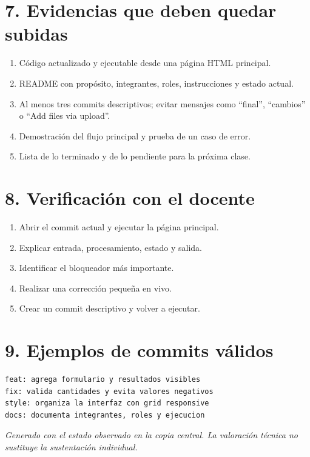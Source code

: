 \documentclass[10pt,a4paper]{article}
\begin{document}
\newpage
\section*{7. Evidencias que deben quedar subidas}
\begin{enumerate}
\item Código actualizado y ejecutable desde una página HTML principal.
\item README con propósito, integrantes, roles, instrucciones y estado actual.
\item Al menos tres commits descriptivos; evitar mensajes como ``final'', ``cambios'' o ``Add files via upload''.
\item Demostración del flujo principal y prueba de un caso de error.
\item Lista de lo terminado y de lo pendiente para la próxima clase.
\end{enumerate}
\section*{8. Verificación con el docente}
\begin{enumerate}
\item Abrir el commit actual y ejecutar la página principal.
\item Explicar entrada, procesamiento, estado y salida.
\item Identificar el bloqueador más importante.
\item Realizar una corrección pequeña en vivo.
\item Crear un commit descriptivo y volver a ejecutar.
\end{enumerate}
\section*{9. Ejemplos de commits válidos}
\begin{lstlisting}
feat: agrega formulario y resultados visibles
fix: valida cantidades y evita valores negativos
style: organiza la interfaz con grid responsive
docs: documenta integrantes, roles y ejecucion
\end{lstlisting}
\vfill
{\small\textit{Generado con el estado observado en la copia central. La valoración técnica no sustituye la sustentación individual.}}
\end{document}
